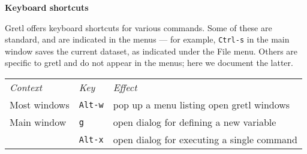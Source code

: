 \documentclass{article}
\begin{document}
\begin{center}
\textbf{Keyboard shortcuts}
\end{center}

\textsf{Gretl} offers keyboard shortcuts for various commands. Some of
these are standard, and are indicated in the menus --- for example,
\texttt{Ctrl-s} in the main window saves the current dataset, as
indicated under the \textsf{File} menu. Others are specific to
\textsf{gretl} and do not appear in the menus; here we document the
latter.

\begin{center}
\begin{tabular}{lll}
\textit{Context} & \textit{Key} & \textit{Effect} \\[6pt]
Most windows & \texttt{Alt-w} & 
  pop up a menu listing open \textsf{gretl} windows \\[6pt]
Main window & \texttt{g} & 
  open dialog for defining a new variable \\
 & \texttt{Alt-x} & 
open dialog for executing a single command



\end{tabular}
\end{center}
\end{document}
